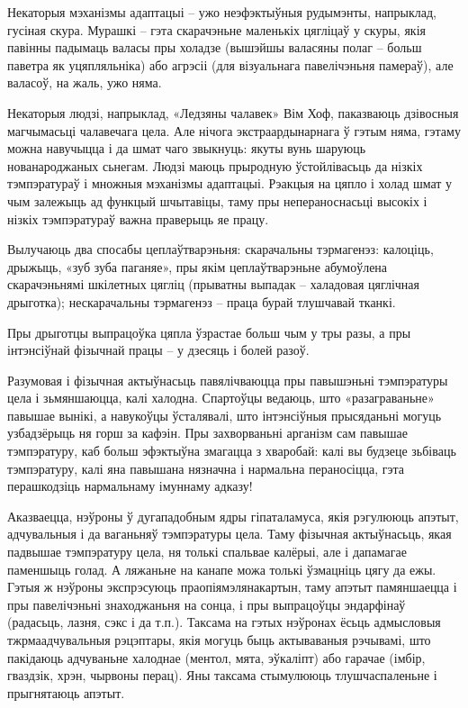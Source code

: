 Некаторыя мэханізмы адаптацыі – ужо неэфэктыўныя рудымэнты, напрыклад, гусіная скура. Мурашкі – гэта скарачэньне маленькіх цягліцаў у скуры, якія павінны падымаць валасы пры холадзе (вышэйшы валасяны полаг – больш паветра як уцяпляльніка) або агрэсіі (для візуальнага павелічэньня памераў), але валасоў, на жаль, ужо няма.

Некаторыя людзі, напрыклад, «Ледзяны чалавек» Вім Хоф, паказваюць дзівосныя магчымасьці чалавечага цела. Але нічога экстраардынарнага ў гэтым няма, гэтаму можна навучыцца і да шмат чаго звыкнуць: якуты вунь шаруюць нованароджаных сьнегам. Людзі маюць прыродную ўстойлівасьць да нізкіх тэмпэратураў і множныя мэханізмы адаптацыі. Рэакцыя на цяпло і холад шмат у чым залежыць ад функцый шчытавіцы, таму пры непераноснасьці высокіх і нізкіх тэмпэратураў важна праверыць яе працу.

Вылучаюць два спосабы цеплаўтварэньня: скарачальны тэрмагенэз: калоціць, дрыжыць, «зуб зуба паганяе», пры якім цеплаўтварэньне абумоўлена скарачэньнямі шкілетных цягліц (прыватны выпадак – халадовая цяглічная дрыготка); нескарачальны тэрмагенэз – праца бурай тлушчавай тканкі.

Пры дрыготцы выпрацоўка цяпла ўзрастае больш чым у тры разы, а пры інтэнсіўнай фізычнай працы – у дзесяць і болей разоў.

Разумовая і фізычная актыўнасьць павялічваюцца пры павышэньні тэмпэратуры цела і зьмяншаюцца, калі халодна. Спартоўцы ведаюць, што «разаграваньне» павышае вынікі, а навукоўцы ўсталявалі, што інтэнсіўныя прысяданьні могуць узбадзёрыць ня горш за кафэін. Пры захворваньні арганізм сам павышае тэмпэратуру, каб больш эфэктыўна змагацца з хваробай: калі вы будзеце зьбіваць тэмпэратуру, калі яна павышана нязначна і нармальна пераносіцца, гэта перашкодзіць нармальнаму імуннаму адказу!

Аказваецца, нэўроны ў дугападобным ядры гіпаталамуса, якія рэгулююць апэтыт, адчувальныя і да ваганьняў тэмпэратуры цела. Таму фізычная актыўнасьць, якая падвышае тэмпэратуру цела, ня толькі спальвае калёрыі, але і дапамагае паменшыць голад. А ляжаньне на канапе можа толькі ўзмацніць цягу да ежы. Гэтыя ж нэўроны экспрэсуюць праопіямэлянакартын, таму апэтыт памяншаецца і пры павелічэньні знаходжаньня на сонца, і пры выпрацоўцы эндарфінаў (радасьць, лазня, сэкс і да т.п.). Таксама на гэтых нэўронах ёсьць адмысловыя тжрмаадчувальныя рэцэптары, якія могуць быць актываваныя рэчывамі, што пакідаюць адчуваньне халоднае (ментол, мята, эўкаліпт) або гарачае (імбір, гваздзік, хрэн, чырвоны перац). Яны таксама стымулююць тлушчаспаленьне і прыгнятаюць апэтыт.


